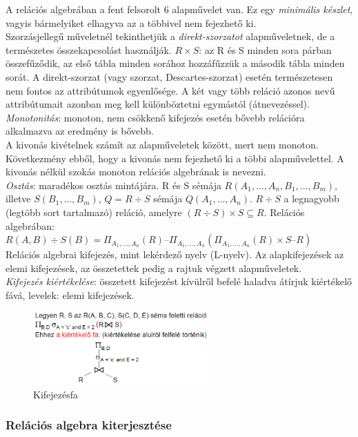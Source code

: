 \documentclass[margin=0px]{article}
\begin{document}
A relációs algebrában a fent felsorolt 6 alapművelet van. Ez egy \textit{minimális készlet}, vagyis bármelyiket elhagyva az a többivel nem fejezhető ki. \\
Szorzásjellegű műveletnél tekinthetjük a \textit{direkt-szorzatot} alapműveletnek, de a természetes összekapcsolást használják. $R \times S$: az R és S minden sora párban összefűződik, az első tábla minden sorához hozzáfűzzük a második tábla minden sorát. A direkt-szorzat (vagy szorzat, Descartes-szorzat) esetén természetesen nem fontos az attribútumok egyenlősége. A két vagy több reláció azonos nevű attribútumait azonban meg kell különböztetni egymástól (átnevezéssel). \\
\textit{Monotonitás}: monoton, nem csökkenő kifejezés esetén bővebb relációra alkalmazva az eredmény is bővebb.\\
A kivonás kivételnek számít az alapműveletek között, mert nem monoton. Következmény ebből, hogy a kivonás nem fejezhető ki a többi alapművelettel. A kivonás nélkül szokás monoton relációs algebrának is nevezni. \\
\textit{Osztás}: maradékos osztás mintájára. R és S sémája $R(A_1,...,A_n,B_1,...,B_m)$, illetve $S(B_1,...,B_m)$, $Q = R \div S$ sémája $Q(A_1,...,A_n)$. $R \div S$ a legnagyobb (legtöbb sort tartalmazó) reláció, amelyre $( R \div S ) \times S \subseteq R.$ Relációs algebrában: $R(A,B) \div S(B) = \Pi_{A_1,...,A_n}(R) – \Pi_{A_1,...,A_n}( \Pi_{A_1,...,A_n}(R) \times S – R )$\\
Relációs algebrai kifejezés, mint lekérdező nyelv (L-nyelv). Az alapkifejezések az elemi kifejezések, az összetettek pedig a rajtuk végzett alapműveletek. \\
\textit{Kifejezés kiértékelése}: összetett kifejezést kívülről befelé haladva átírjuk kiértékelő fává, levelek: elemi kifejezések.
\begin{figure}[H]
    \centering
    \includegraphics[width=0.6\textwidth]{img/relalg1.png}
    \caption{Kifejezésfa}
\end{figure}

\subsubsection{Relációs algebra kiterjesztése}
\end{document}
